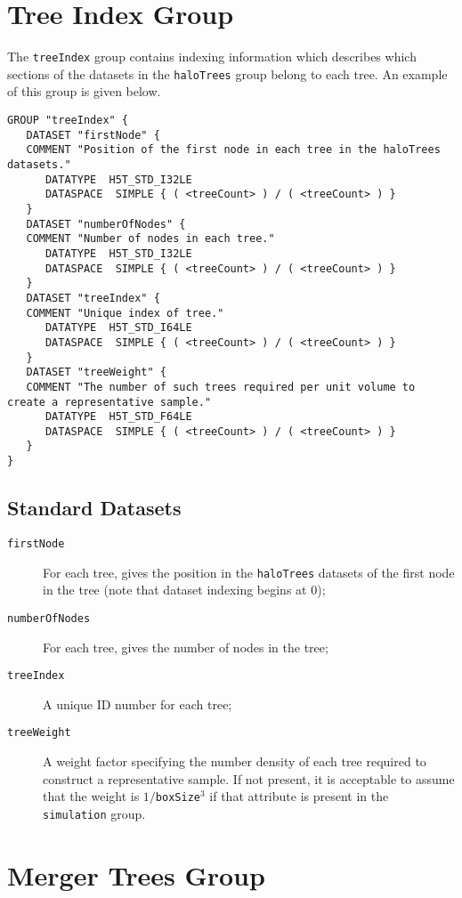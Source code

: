 \section{Tree Index Group}

The {\tt treeIndex} group contains indexing information which describes which sections of the datasets in the {\tt haloTrees} group belong to each tree. An example of this group is given below.

\begin{verbatim}
GROUP "treeIndex" {
   DATASET "firstNode" {
   COMMENT "Position of the first node in each tree in the haloTrees datasets."
      DATATYPE  H5T_STD_I32LE
      DATASPACE  SIMPLE { ( <treeCount> ) / ( <treeCount> ) }
   }
   DATASET "numberOfNodes" {
   COMMENT "Number of nodes in each tree."
      DATATYPE  H5T_STD_I32LE
      DATASPACE  SIMPLE { ( <treeCount> ) / ( <treeCount> ) }
   }
   DATASET "treeIndex" {
   COMMENT "Unique index of tree."
      DATATYPE  H5T_STD_I64LE
      DATASPACE  SIMPLE { ( <treeCount> ) / ( <treeCount> ) }
   }
   DATASET "treeWeight" {
   COMMENT "The number of such trees required per unit volume to create a representative sample."
      DATATYPE  H5T_STD_F64LE
      DATASPACE  SIMPLE { ( <treeCount> ) / ( <treeCount> ) }
   }
}
\end{verbatim}

\subsection{Standard Datasets}

\begin{description}
 \item [{\tt firstNode}] For each tree, gives the position in the {\tt haloTrees} datasets of the first node in the tree (note that dataset indexing begins at 0);
 \item [{\tt numberOfNodes}] For each tree, gives the number of nodes in the tree;
 \item [{\tt treeIndex}] A unique ID number for each tree;
 \item [{\tt treeWeight}] A weight factor specifying the number density of each tree required to construct a representative sample. If not present, it is acceptable to assume that the weight is $1/${\tt boxSize}$^3$ if that attribute is present in the {\tt simulation} group.
\end{description}

\section{Merger Trees Group}

